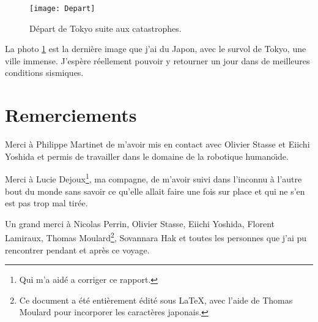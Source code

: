 \documentclass[11pt,journal]{RapportFR}
\begin{document}
\begin{CJK*}{UTF8}{min}
\begin{figure}[!t]
\centering
\texttt{[image: Depart]}
\caption{D\'epart de Tokyo suite aux catastrophes.}
\label{fig_depart}
\end{figure}

La photo \ref{fig_depart} est la derni\`ere image que j'ai du Japon, avec le survol de Tokyo, une ville immense. J'esp\`ere r\'eellement pouvoir y retourner un jour dans de meilleures conditions sismiques.


\section*{Remerciements}


Merci \`a Philippe Martinet de m'avoir mis en contact avec Olivier Stasse et Eiichi Yoshida et permis de travailler dans le domaine de la robotique humano\"\i de. 

Merci \`a Lucie Dejoux\footnote{Qui m'a aid\'e a corriger ce rapport.}, ma compagne, de m'avoir suivi dans l'inconnu \`a l'autre bout du monde sans savoir ce qu'elle allait faire une fois sur place et qui ne s'en est pas trop mal tir\'ee.

Un grand merci \`a Nicolas Perrin, Olivier Stasse, Eiichi Yoshida, Florent Lamiraux, Thomas Moulard\footnote{Ce document a \'et\'e enti\`erement \'edit\'e sous \LaTeX, avec l'aide de Thomas Moulard pour incorporer les caract\`eres japonais.}, Sovannara Hak et toutes les personnes que j'ai pu rencontrer pendant et apr\`es ce voyage.




\end{CJK*}
\end{document}
